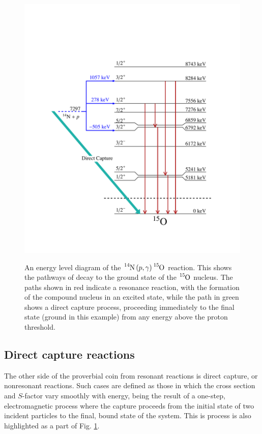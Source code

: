 \begin{figure}
\includegraphics[width=\linewidth]{figures/levelsO15.pdf}
\label{fig: level diagram}
\caption{An energy level diagram of the $\ce{^{14}N} \left( p, \gamma \right) \ce{^{15}O}$ reaction. This shows the pathways of decay to the ground state of the $\ce{^{15}O}$ nucleus. The paths shown in red indicate a resonance reaction, with the formation of the compound nucleus in an excited state, while the path in green shows a direct capture process, proceeding immediately to the final state (ground in this example) from any energy above the proton threshold.}
\end{figure}




\subsection{Direct capture reactions}

The other side of the proverbial coin from resonant reactions is direct capture, or nonresonant reactions. Such cases are defined as those in which the cross section and $S$-factor vary smoothly with energy, being the result of a one-step, electromagnetic process where the capture proceeds from the initial state of two incident particles to the final, bound state of the system. This is process is also highlighted as a part of Fig. \ref{fig: level diagram}. 

